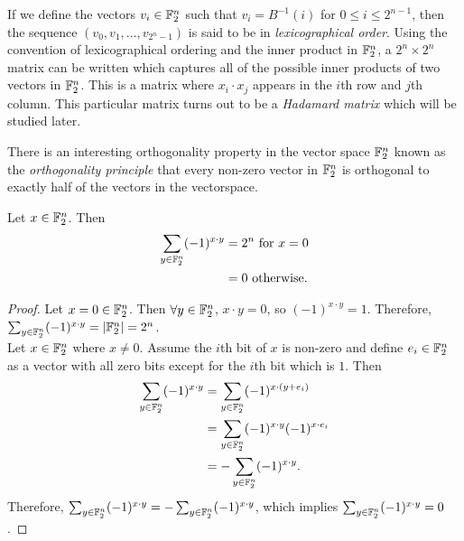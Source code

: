 \par If we define the vectors $v_i\in\mathbb{F}_2^n$ such that $v_i=B^{-1}(i)$
for $0\leq i\leq2^{n-1}$, then the sequence $(v_0,v_1,\allowbreak \dots,
\allowbreak v_{2^n-1})$ is said to be in {\em lexicographical order}.
Using the convention of lexicographical ordering and the inner product in
$\mathbb{F}_2^n$, a $2^n\times 2^n$ matrix can be written which captures all of
the possible inner products of two vectors in $\mathbb{F}_2^n$. This is a matrix
where $x_i\cdot x_j$ appears in the $i$th row and $j$th column. This
particular matrix turns out to be a {\em Hadamard matrix} which will be
studied later.

\par There is an interesting orthogonality property in the vector space
$\mathbb{F}_2^n$ known as the {\em orthogonality principle} that every non-zero
vector in $\mathbb{F}_2^n$ is orthogonal to exactly half of the vectors in the
vectorspace.

\begin{theorem}
\label{thm:orthogonality-principle}
  Let $x\in\mathbb{F}_2^n$. Then
  \begin{align*}
    \sum_{y\in\mathbb{F}_2^n}(-1)^{x\cdot y}
      &= 2^n {\rm \ for\ } x=0 \\
      &= 0 {\rm \ otherwise.}
  \end{align*}
\end{theorem}

\begin{proof}
  Let $x=0\in\mathbb{F}_2^n$. Then $\forall y\in\mathbb{F}_2^n$, $x\cdot y=0$, so
  $(-1)^{x\cdot y}=1$. Therefore, $\sum_{y\in\mathbb{F}_2^n}(-1)^{x\cdot y}=
  \allowbreak\lvert\mathbb{F}_2^n\rvert=\allowbreak 2^n$. \\

  Let $x\in\mathbb{F}_2^n$ where $x\not=0$. Assume the $i$th bit of $x$ is
  non-zero and define $e_i\in\mathbb{F}_2^n$ as a vector with all zero bits
  except for the $i$th bit which is $1$. Then
	\begin{align*}
    \sum_{y\in\mathbb{F}_2^n}(-1)^{x\cdot y}
      &= \sum_{y\in\mathbb{F}_2^n}(-1)^{x\cdot (y+e_i)} \\
      &= \sum_{y\in\mathbb{F}_2^n}(-1)^{x\cdot y}(-1)^{x\cdot e_i} \\
      &= -\sum_{y\in\mathbb{F}_2^n}(-1)^{x\cdot y}.
  \end{align*}
  Therefore, $\sum_{y\in\mathbb{F}_2^n}(-1)^{x\cdot y}=\allowbreak
  -\sum_{y\in\mathbb{F}_2^n}(-1)^{x\cdot y}$, which implies
  $\sum_{y\in\mathbb{F}_2^n}(-1)^{x\cdot y}=0$.
\end{proof}

